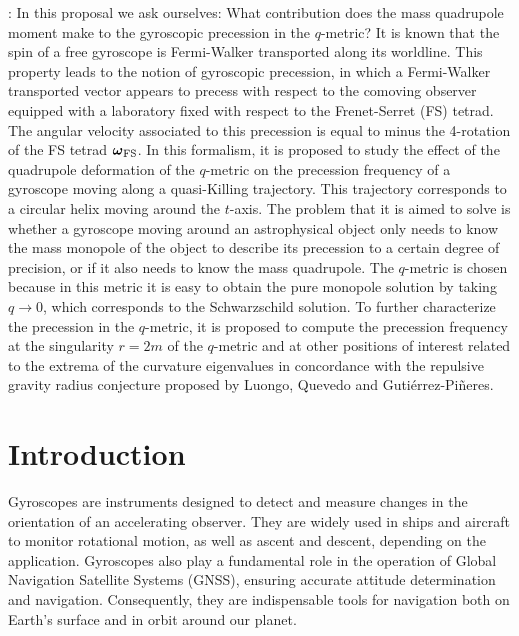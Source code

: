 \documentclass[12pt]{article}
\def\wfs{\mbi{\omega}_{\rm FS}}
\newcommand{\mbi}[1]{\boldsymbol{#1}}    %
\begin{document}
: 
\noindent In this proposal we ask ourselves: What contribution does the mass quadrupole moment make to the gyroscopic precession in the $q$-metric? It is known that the spin of a free gyroscope is Fermi-Walker transported along its worldline. This property leads to the notion of gyroscopic precession, in which a Fermi-Walker transported vector appears to precess with respect to the comoving observer equipped with a laboratory fixed with respect to the Frenet-Serret (FS) tetrad. The angular velocity associated to this precession is equal to minus the 4-rotation of the FS tetrad $\wfs$. In this formalism, it is proposed to study the effect of the quadrupole deformation of the $q$-metric on the precession frequency of a gyroscope moving along a quasi-Killing trajectory. This trajectory corresponds to a circular helix moving around the $t$-axis. The problem that it is aimed to solve is whether a gyroscope moving around an astrophysical object only needs to know the mass monopole of the object to describe its precession to a certain degree of precision, or if it also needs to know the mass quadrupole. The $q$-metric is chosen because in this metric it is easy to obtain the pure monopole solution by taking $q\to 0$, which corresponds to the Schwarzschild solution. To further characterize the precession in the $q$-metric, it is proposed to compute the precession frequency at the singularity $r=2m$ of the $q$-metric and at other positions of interest related to the extrema of the curvature eigenvalues in concordance with the repulsive gravity radius conjecture proposed by Luongo, Quevedo and Gutiérrez-Piñeres.
\newpage

\tableofcontents
\newpage

\section{Introduction}
Gyroscopes are instruments designed to detect and measure changes in the orientation of an accelerating observer. They are widely used in ships and aircraft to monitor rotational motion, as well as ascent and descent, depending on the application. Gyroscopes also play a fundamental role in the operation of Global Navigation Satellite Systems (GNSS), ensuring accurate attitude determination and navigation. Consequently, they are indispensable tools for navigation both on Earth's surface and in orbit around our planet.\\
\end{document}
